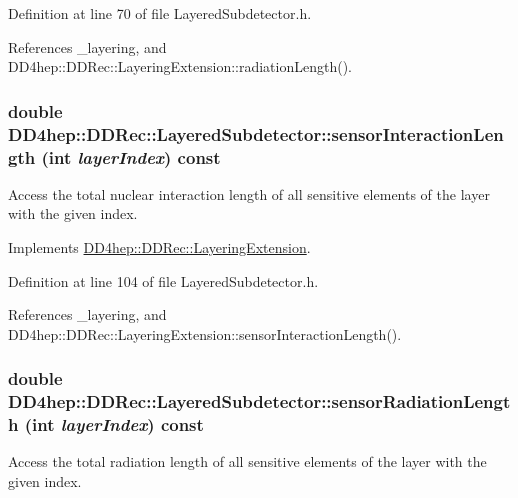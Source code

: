 Definition at line 70 of file LayeredSubdetector.h.

References \_\-layering, and DD4hep::DDRec::LayeringExtension::radiationLength().\hypertarget{class_d_d4hep_1_1_d_d_rec_1_1_layered_subdetector_adbf23ebe50a26ecef9dd053b4066ed4d}{
\subsubsection[{sensorInteractionLength}]{\setlength{\rightskip}{0pt plus 5cm}double DD4hep::DDRec::LayeredSubdetector::sensorInteractionLength (int {\em layerIndex}) const}}
\label{class_d_d4hep_1_1_d_d_rec_1_1_layered_subdetector_adbf23ebe50a26ecef9dd053b4066ed4d}


Access the total nuclear interaction length of all sensitive elements of the layer with the given index. 

Implements \hyperlink{class_d_d4hep_1_1_d_d_rec_1_1_layering_extension_a99d3faa45e42d0a34635ea7f3ac2c038}{DD4hep::DDRec::LayeringExtension}.

Definition at line 104 of file LayeredSubdetector.h.

References \_\-layering, and DD4hep::DDRec::LayeringExtension::sensorInteractionLength().\hypertarget{class_d_d4hep_1_1_d_d_rec_1_1_layered_subdetector_a2b1079b698e6ed15af85e1558f893540}{
\subsubsection[{sensorRadiationLength}]{\setlength{\rightskip}{0pt plus 5cm}double DD4hep::DDRec::LayeredSubdetector::sensorRadiationLength (int {\em layerIndex}) const}}
\label{class_d_d4hep_1_1_d_d_rec_1_1_layered_subdetector_a2b1079b698e6ed15af85e1558f893540}


Access the total radiation length of all sensitive elements of the layer with the given index. 

